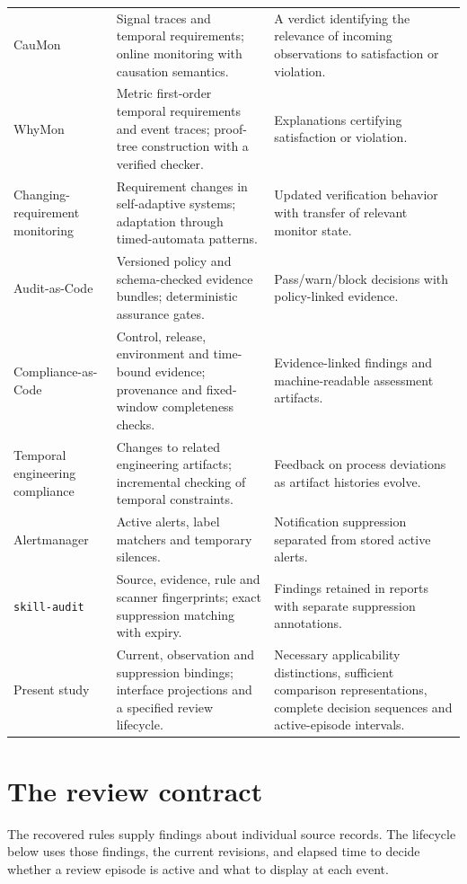 \documentclass[preprint,11pt]{elsarticle}
\newcommand{\code}[1]{\texttt{#1}}
\begin{document}
{\begin{longtable}{@{}>{\raggedright\arraybackslash}p{.235\linewidth}>{\raggedright\arraybackslash}p{.38\linewidth}>{\raggedright\arraybackslash}p{}@{}}
CauMon \cite{zhang2026caumon} & Signal traces and temporal requirements; online monitoring with causation semantics. & A verdict identifying the relevance of incoming observations to satisfaction or violation. \\
WhyMon \cite{lima2024explainable} & Metric first-order temporal requirements and event traces; proof-tree construction with a verified checker. & Explanations certifying satisfaction or violation. \\
Changing-requirement monitoring \cite{carwehl2023changing} & Requirement changes in self-adaptive systems; adaptation through timed-automata patterns. & Updated verification behavior with transfer of relevant monitor state. \\
Audit-as-Code \cite{muhammad2026audit} & Versioned policy and schema-checked evidence bundles; deterministic assurance gates. & Pass/warn/block decisions with policy-linked evidence. \\
Compliance-as-Code \cite{nwekeyeng2026compliance} & Control, release, environment and time-bound evidence; provenance and fixed-window completeness checks. & Evidence-linked findings and machine-readable assessment artifacts. \\
Temporal engineering compliance \cite{ratiu2026runtime} & Changes to related engineering artifacts; incremental checking of temporal constraints. & Feedback on process deviations as artifact histories evolve. \\
Alertmanager \cite{prometheus2026alertmanager} & Active alerts, label matchers and temporary silences. & Notification suppression separated from stored active alerts. \\
\code{skill-audit} \cite{skillaudit2026suppression} & Source, evidence, rule and scanner fingerprints; exact suppression matching with expiry. & Findings retained in reports with separate suppression annotations. \\
Present study & Current, observation and suppression bindings; interface projections and a specified review lifecycle. & Necessary applicability distinctions, sufficient comparison representations, complete decision sequences and active-episode intervals. \\
\end{longtable}
}

\section{The review contract}
The recovered rules supply findings about individual source records. The lifecycle below uses those findings, the current revisions, and elapsed time to decide whether a review episode is active and what to display at each event.
\end{document}
